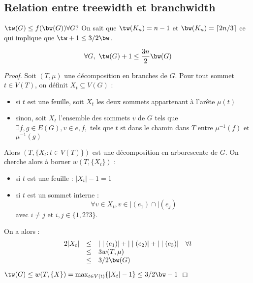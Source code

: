 \documentclass[a4paper, 11pt]{thesis}
\begin{document}
\subsection{Relation entre treewidth et branchwidth}

$\tw(G) \leq f(\bw(G)) \forall G ?$
On sait que $\tw(K_n) = n - 1$ et $\bw(K_n) = \lceil 2n/3 \rceil$ ce qui implique que $\tw + 1 \leq
3/2 \bw$.

\begin{prop}
    \begin{displaymath}
        \forall G,\ \tw(G) + 1 \leq \frac{3n}{2} \bw(G)
    \end{displaymath}
\end{prop}

\begin{proof}
    Soit $(T, \mu)$ une décomposition en branches de $G$. Pour tout sommet $t \in V(T)$, on définit
    $X_t \subseteq V(G)$ : 
    \begin{itemize}
        \item si $t$ est une feuille, soit $X_t$  les deux sommets appartenant à l'arête $\mu(t)$
        \item sinon, soit $X_t$ l'ensemble des sommets $v$ de $G$ tels que $\exists f, g \in E(G), v
            \in e, f,$ tels que $t$ st dans le chamin dans $T$ entre $\mu^{-1}(f)$ et $\mu^{-1}(g)$
    \end{itemize}
    Alors $(T, \{X_t : t \in V(T) \})$ est une décomposition en arborescente de $G$. On cherche
    alors à borner $w(T, \{X_t\})$ :
    \begin{itemize}
        \item si $t$ est une feuille : $|X_t| - 1 = 1 $
        \item si $t$ est un sommet interne :
            \begin{displaymath}
                \forall v \in X_t, v \in \mid(e_1) \cap \mid(e_j)
            \end{displaymath}
            avec $i \neq j$ et $i, j \in \{1, 2? 3\}$.
    \end{itemize}
    On a alors : \begin{displaymath}
        \begin{array}{rcll}
            2|X_t| & \leq & |\mid(e_1)| + |\mid(e_2)| + |\mid(e_3)| & \forall t \\
                   & \leq & 3 w(T, \mu) \\
                   & \leq & 3/2 \bw(G) \\
        \end{array}
    \end{displaymath}
    $\tw(G) \leq w(T, \{X\}) = \max_{t \in V(t)} \{|X_t| - 1\} \leq 3/2 \bw -1$
\end{proof}
\end{document}
